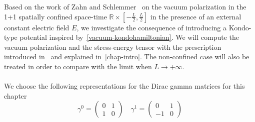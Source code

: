 Based on the work of Zahn and Schlemmer~\cite{Zahn2015} on the vacuum polarization in the 1+1 spatially confined space-time $\mathbb{R}\times[-\frac{L}{2}, \frac L 2]$ in the presence of an external constant electric field $E$,
we investigate the consequence of introducing a Kondo-type potential inspired by~\cref{vacuum-kondohamiltonian}.
We will compute the vacuum polarization and the stress-energy tensor with the prescription introduced in~\cite{Zahn2015} and explained in~\cref{chap-intro}.
The non-confined case will also be treated in order to compare with the limit when $L\rightarrow +\infty$.\\\\
We choose the following representations for the Dirac gamma matrices for this chapter
\begin{equation*}
\gamma^0 = \begin{pmatrix}
0 & 1 \\
1 & 0 \end{pmatrix}  \quad  \gamma^1 = \begin{pmatrix}
0  & 1 \\
-1 & 0
\end{pmatrix}
\end{equation*}
%
